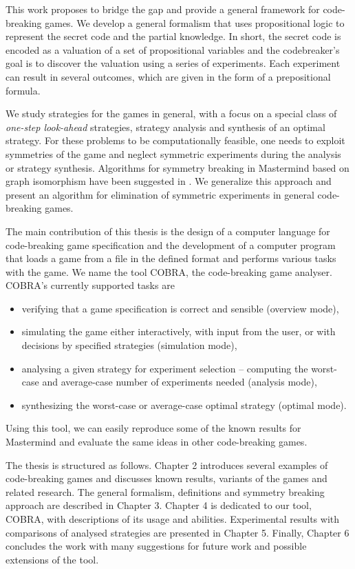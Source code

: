 This work proposes to bridge the gap and provide
  a general framework for code-breaking games.
We develop a general formalism that uses propositional logic to
  represent the secret code and the partial knowledge.
In short, the secret code is encoded as a valuation of
  a set of propositional variables
  and the codebreaker's goal is to discover the valuation
  using a series of experiments.
Each experiment can result in several outcomes,
  which are given in the form of a prepositional formula.

We study strategies for the games in general, with a focus on
  a special class of \emph{one-step look-ahead} strategies,
  strategy analysis and synthesis of an optimal strategy.
For these problems to be computationally feasible, one needs to exploit
  symmetries of the game and neglect symmetric experiments during the analysis
  or strategy synthesis.
Algorithms for symmetry breaking in Mastermind
  based on graph isomorphism have been suggested in \cite{cbg-nauty}.
We generalize this approach and present
  an algorithm for elimination of symmetric experiments
  in general code-breaking games.

The main contribution of this thesis is the design of a computer language for
  code-breaking game specification
  and the development of a computer program that
  loads a game from a file in the defined format
  and performs various tasks with the game.
We name the tool COBRA, the code-breaking game analyser.
COBRA's currently supported tasks are
\begin{itemize}
\item verifying that a game specification is correct
  and sensible (overview mode),
\item simulating the game either interactively, with input from the user, or
  with decisions by specified strategies (simulation mode),
\item analysing a given strategy for experiment selection --
  computing the worst-case and average-case number of experiments needed (analysis mode),
\item synthesizing the worst-case or average-case optimal strategy (optimal mode).
\end{itemize}
Using this tool, we can easily reproduce some of the known results
  for Mastermind and evaluate the same ideas in other code-breaking games.

The thesis is structured as follows.
Chapter 2 introduces several examples of code-breaking games and
  discusses known results, variants of the games and related research.
The general formalism, definitions and symmetry breaking approach
  are described in Chapter 3.
Chapter 4 is dedicated to our tool, COBRA, with descriptions of its usage and
  abilities.
Experimental results with comparisons of analysed strategies
  are presented in Chapter 5.
Finally, Chapter 6 concludes the work with many suggestions for future work
  and possible extensions of the tool.






